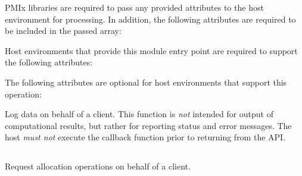\begin{arglist}
\end{arglist}


\reqattrstart
\ac{PMIx} libraries are required to pass any provided attributes to the host environment for processing. In addition, the following attributes are required to be included in the passed  array:


Host environments that provide this module entry point are required to support the following attributes:


\reqattrend

\optattrstart
The following attributes are optional for host environments that support this operation:


\optattrend

\descr

Log data on behalf of a client. This function is \textit{not} intended for output of computational results, but rather for reporting status and error messages. The host \emph{must not} execute the callback function prior to returning from the \ac{API}.


\subsection{}

\summary

Request allocation operations on behalf of a client.

